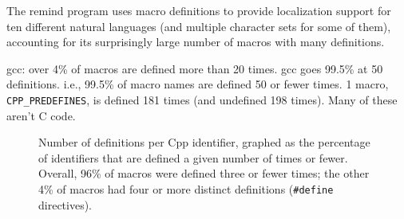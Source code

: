 \documentclass[10pt]{article}
\newcommand{\pkg}[1]{\textsf{#1}}
\begin{document}
                The \pkg{remind} program uses macro definitions to provide
                localization support for ten different natural languages
                (and multiple character sets for some of them), accounting
                for its surprisingly large number of macros with many
                definitions.

            \pkg{gcc}: over 4\% of macros are defined more than 20 times.
                gcc goes 99.5\% at 50 definitions.
                i.e., 99.5\% of macro names are defined 50 or fewer times.
                1 macro, \verb|CPP_PREDEFINES|, is defined 181 times (and undefined
                  198 times).
                Many of these aren't C code.

        \label{sec:usage}



        \begin{figure}
        \centerline{}
        \caption{Number of definitions per Cpp identifier, graphed as
          the percentage of identifiers that are defined a given number of times
          or fewer.  Overall, 96\% of macros were defined three or
          fewer times; the other 4\% of macros had four or more distinct
          definitions ({\tt \#define} directives).}
        \label{fig:freq-def-cat}
        \end{figure}


\end{document}
